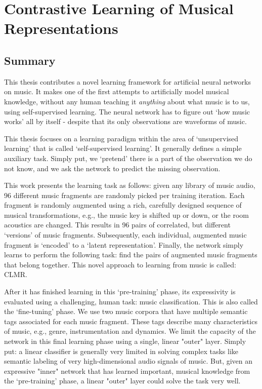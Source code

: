 \chapter*{Contrastive Learning of Musical Representations}
\section*{Summary}

This thesis contributes a novel learning framework for artificial neural networks on music.
It makes one of the first attempts to artificially model musical knowledge, without any human teaching it \textit{anything} about what music is to us, using self-supervised learning. The neural network has to figure out `how music works' all by itself - despite that its only observations are waveforms of music.

This thesis focuses on a learning paradigm within the area of `unsupervised learning' that is called `self-supervised learning'.
It generally defines a simple auxiliary task. Simply put, we `pretend' there is a part of the observation we do not know, and we ask the network to predict the missing observation.

This work presents the learning task as follows: given any library of music audio, 96 different music fragments are randomly picked per training iteration. Each fragment is randomly augmented using a rich, carefully designed sequence of musical transformations, e.g., the music key is shifted up or down, or the room acoustics are changed. This results in 96 pairs of correlated, but different `versions' of music fragments. Subsequently, each individual, augmented music fragment is `encoded' to a `latent representation'. Finally, the network simply learns to perform the following task: find the pairs of augmented music fragments that belong together. This novel approach to learning from music is called: CLMR.

After it has finished learning in this `pre-training' phase, its expressivity is evaluated using a challenging, human task: music classification. This is also called the `fine-tuning' phase. We use two music corpora that have multiple semantic tags associated for each music fragment. These tags describe many characteristics of music, e.g., genre, instrumentation and dynamics. We limit the capacity of the network in this final learning phase using a single, linear "outer" layer. Simply put: a linear classifier is generally very limited in solving complex tasks like semantic labeling of very high-dimensional audio signals of music. But, given an expressive "inner" network that has learned important, musical knowledge from the `pre-training' phase, a linear "outer" layer could solve the task very well.


